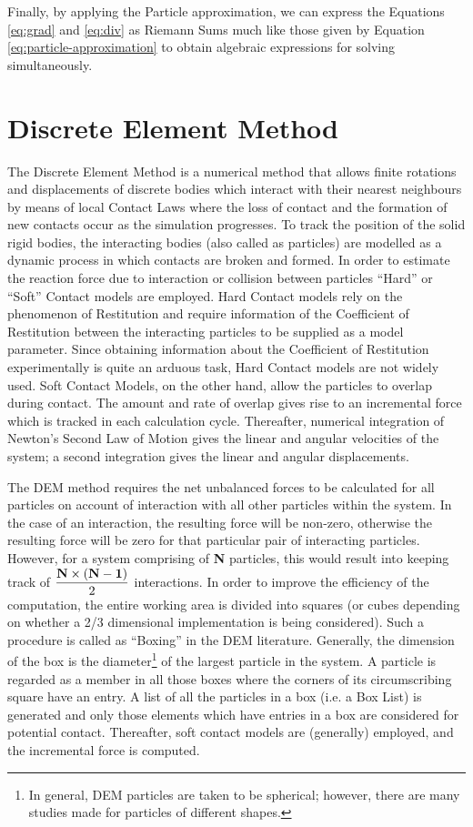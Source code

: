 Finally, by applying the Particle approximation, we can express the Equations \eqref{eq:grad} and \eqref{eq:div} as Riemann Sums much like those given by Equation \eqref{eq:particle-approximation} to obtain algebraic expressions for solving simultaneously.

\section{Discrete Element Method} \label{sec:DEM}

The Discrete Element Method \cite{mishra} is a numerical method that allows finite rotations and displacements of discrete bodies which interact with their nearest neighbours by means of local Contact Laws where the loss of contact and the formation of new contacts occur as the simulation progresses. To track the position of the solid rigid bodies, the interacting bodies (also called as particles) are modelled as a dynamic process in which contacts are broken and formed. In order to estimate the reaction force due to interaction or collision between particles ``Hard'' or ``Soft'' Contact models are employed. Hard Contact models rely on the phenomenon of Restitution and require information of the Coefficient of Restitution between the interacting particles to be supplied as a model parameter. Since obtaining information about the Coefficient of Restitution experimentally is quite an arduous task, Hard Contact models are not widely used. Soft Contact Models, on the other hand, allow the particles to overlap during contact. The amount and rate of overlap gives rise to an incremental force which is tracked in each calculation cycle. Thereafter, numerical integration of Newton's Second Law of Motion gives the linear and angular velocities of the system; a second integration gives the linear and angular displacements.

The DEM method requires the net unbalanced forces to be calculated for all particles on account of interaction with all other particles within the system. In the case of an interaction, the resulting force will be non-zero, otherwise the resulting force will be zero for that particular pair of interacting particles. However, for a system comprising of \textbf{N} particles, this would result into keeping track of $\dfrac{{\bf{N}} \times {\bf{(N-1)}}}{2}$ interactions. In order to improve the efficiency of the computation, the entire working area is divided into squares (or cubes depending on whether a 2/3 dimensional implementation is being considered). Such a procedure is called as ``Boxing'' in the DEM literature. Generally, the dimension of the box is the diameter\footnote{In general, DEM particles are taken to be spherical; however, there are many studies made for particles of different shapes.} of the largest particle in the system. A particle is regarded as a member in all those boxes where the corners of its circumscribing square have an entry.  A list of all the particles in a box (i.e. a Box List) is generated and only those elements which have entries in a box are considered for potential contact. Thereafter, soft contact models are (generally) employed, and the incremental force is computed.